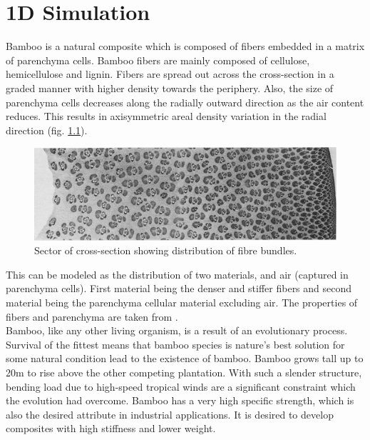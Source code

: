 \documentclass[openright,twoside]{iitkthesis}
\begin{document}
\chapter{1D Simulation}
Bamboo is a natural composite which is composed of fibers embedded in a matrix of parenchyma cells. Bamboo fibers are mainly composed of cellulose, hemicellulose and lignin.\cite{mwaikambo2006review} Fibers are spread out across the cross-section in a graded manner with higher density towards the periphery. Also, the size of parenchyma cells decreases along the radially outward direction as the air content reduces. This results in axisymmetric areal density variation in the radial direction (fig. \ref{fig:fibrebundle}).
\begin{figure}[H]
\begin{center}
\includegraphics[scale=.35]{./Plots/normal/radialfibers.png}
\caption{Sector of cross-section showing distribution of fibre bundles. \cite{grosser1971anatomy}}
\label{fig:fibrebundle}
\end{center}
\end{figure}

This can be modeled as the distribution of two materials, and air (captured in parenchyma cells). First material being the denser and stiffer fibers and second material being the parenchyma cellular material excluding air. The properties of fibers and parenchyma are taken from \cite{mannan2018stiffness}\cite{mwaikambo2006review}. \\
Bamboo, like any other living organism, is a result of an evolutionary process. Survival of the fittest means that bamboo species is nature's best solution for some natural condition lead to the existence of bamboo. Bamboo grows tall up to 20m to rise above the other competing plantation. With such a slender structure, bending load due to high-speed tropical winds are a significant constraint which the evolution had overcome. Bamboo has a very high specific strength, which is also the desired attribute in industrial applications. It is desired to develop composites with high stiffness and lower weight.\\ 
\end{document}
